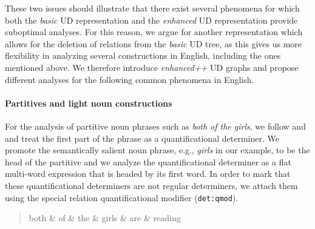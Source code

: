 \documentclass[10pt, a4paper]{article}
\begin{document}
These two issues should illustrate that there exist several phenomena for which both the \textit{basic} UD representation
and the \textit{enhanced} UD representation provide suboptimal analyses. 
For this reason, we argue for another representation which allows for the deletion of relations from the \textit{basic} UD tree, as
this gives us more flexibility in analyzing several constructions in English, including the ones mentioned above. 
We therefore introduce \textit{enhanced++} UD graphs and propose different analyses for the following common phenomena in English.


\paragraph{Partitives and light noun constructions} 

For the analysis of partitive noun phrases such as \textit{both of the girls}, 
we follow  and  and treat
the first part of the phrase as a quantificational determiner. We 
promote the semantically salient noun phrase, e.g., \textit{girls} in our example, to 
be the head of the partitive and we analyze the quantificational determiner
as a flat multi-word expression that is headed by its first word. In order to
mark that these quantificational determiners are not regular determiners,
we attach them using the special relation quantificational modifier (\texttt{det:qmod}).


\begin{quote}
\begin{center}
\begin{dependency}[column sep=0.2em, edge unit distance=2.25ex]
  \begin{deptext}
    both \& of \& the \& girls \& are \& reading \\
  \end{deptext}
\end{dependency}
\end{center}
\end{quote}
\end{document}
